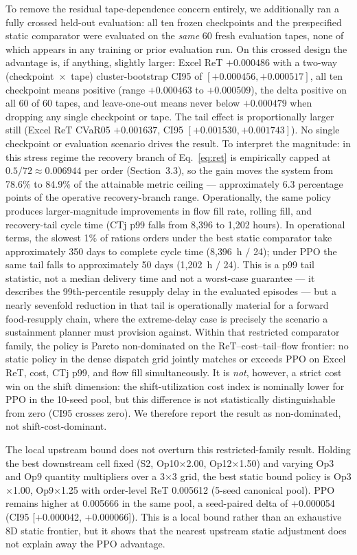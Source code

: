 To remove the residual tape-dependence concern entirely, we additionally
ran a fully crossed held-out evaluation: all ten frozen checkpoints and
the prespecified static comparator were evaluated on the \emph{same} 60
fresh evaluation tapes, none of which appears in any training or prior
evaluation run. On this crossed design the advantage is, if anything,
slightly larger: Excel ReT $+0.000486$ with a two-way
(checkpoint~$\times$~tape) cluster-bootstrap CI95 of
$[+0.000456, +0.000517]$, all ten checkpoint means positive (range
$+0.000463$ to $+0.000509$), the delta positive on all 60 of 60 tapes,
and leave-one-out means never below $+0.000479$ when dropping any single
checkpoint or tape. The tail effect is proportionally larger still
(Excel ReT CVaR05 $+0.001637$, CI95 $[+0.001530, +0.001743]$). No single
checkpoint or evaluation scenario drives the result.
To interpret the magnitude: in this stress regime the recovery branch of
Eq.~\eqref{eq:ret} is empirically capped at $0.5/72 \approx 0.006944$
per order (Section~3.3),
so the gain moves the system from 78.6\% to 84.9\% of the attainable
metric ceiling --- approximately 6.3 percentage points of the operative
recovery-branch range. Operationally, the same policy produces
larger-magnitude
improvements in flow fill rate, rolling fill, and
recovery-tail cycle time (CTj p99 falls from 8{,}396 to 1{,}202 hours).
In operational terms, the slowest 1\% of rations orders under the best
static comparator take approximately 350 days to complete cycle time
(8{,}396~h $/$ 24); under PPO the same tail falls to approximately 50
days (1{,}202~h $/$ 24). This is a p99 tail statistic, not a median
delivery time and not a worst-case guarantee --- it describes the
99th-percentile resupply delay in the evaluated episodes --- but a
nearly sevenfold reduction in
that tail is operationally material for a forward food-resupply chain,
where the extreme-delay case is precisely the scenario a sustainment
planner must provision against.
Within that restricted comparator family, the policy is Pareto non-dominated
on the ReT--cost--tail--flow frontier:
no static policy in the dense dispatch grid jointly matches or exceeds PPO on Excel
ReT, cost, CTj p99, and flow fill simultaneously. It is \emph{not},
however, a strict cost win on the shift dimension: the shift-utilization
cost index is nominally lower for PPO in the 10-seed pool, but this
difference is not statistically distinguishable from zero (CI95 crosses
zero). We therefore report the result as non-dominated, not
shift-cost-dominant.

The local upstream bound does not overturn this restricted-family result.
Holding the best
downstream cell fixed (S2, Op10$\times$2.00, Op12$\times$1.50) and
varying Op3 and Op9 quantity multipliers over a 3$\times$3 grid, the best
static bound policy is Op3$\times$1.00, Op9$\times$1.25 with order-level
ReT 0.005612 (5-seed canonical pool). PPO remains higher at 0.005666 in
the same pool, a seed-paired delta of
+0.000054 (CI95 [+0.000042, +0.000066]). This is a local bound rather
than an exhaustive 8D static frontier, but it shows that the nearest
upstream static adjustment does not explain away the PPO advantage.

